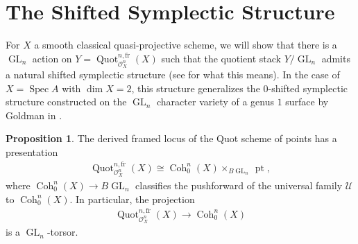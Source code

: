 \documentclass{article}
\numberwithin{equation}{section}
\theoremstyle{quest}
\theoremstyle{definition}
\newtheorem{prop}[thm]{Proposition}
\theoremstyle{remark}
\DeclareMathOperator{\GL}{GL}
\DeclareMathOperator{\Spec}{Spec}
\DeclareMathOperator{\pt}{pt}
\DeclareMathOperator{\Coh}{Coh}
\DeclareMathOperator{\Quot}{Quot}
\begin{document}
\section{The Shifted Symplectic Structure}
\label{sec:symplectic-structure}
For $X$ a smooth classical quasi-projective scheme, we will show that there is a $\GL_n$ action on $Y=\Quot^{n,\text{fr}}_{\mathscr{O}_X^n}(X)$ such that the quotient stack $Y /\GL_n$ admits a natural shifted symplectic structure (see \cite{PTVV} for what this means). In the case of $X=\Spec A$ with $\dim X=2$, this structure generalizes the 0-shifted symplectic structure constructed on the $\GL_n$ character variety of a genus $1$ surface by Goldman in \cite{gold}.
\begin{prop}\label{prop:quot-scheme-is-torsor}
	The derived framed locus of the Quot scheme of points has a presentation
	\begin{align*}
		\Quot^{n,\text{fr}}_{\mathscr{O}_X^n}(X)\cong\Coh^n_0(X)\times _{B\GL_n}\pt,
	\end{align*} 
	where $\Coh^n_0(X)\to B\GL_n$ classifies the pushforward of the universal family $\mathscr{U}$ to $\Coh^n_0(X)$. In particular, the projection
	\begin{align*}
		\Quot^{n,\text{fr}}_{\mathscr{O}^n_X}(X)\to \Coh^n_0(X)
	\end{align*} 
	is a $\GL_n$-torsor.
\end{prop} 
\end{document}
